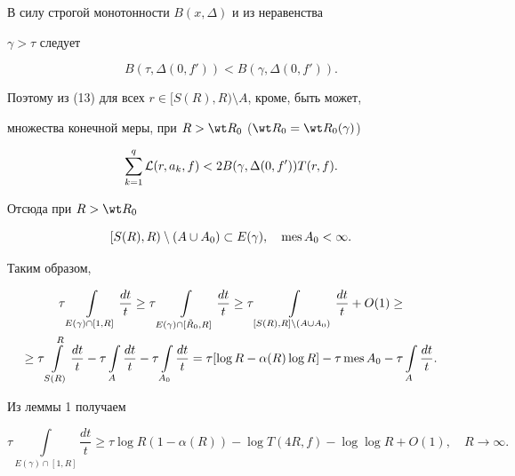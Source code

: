 В силу строгой монотонности $B(x,\Delta)$ и из неравенства


$\gamma>\tau$ следует 


$$


B(\tau,\Delta(0,f'))<B(\gamma,\Delta(0,f')).


$$


Поэтому из (13) для всех  $r\in [S(R),R)\setminus A$, кроме, быть может,


множества конечной меры, при $R>\wt R_0$ ($\wt R_0=\wt R_0(\gamma)$)


$$


\sum\limits_{k=1}^{q}{\cal L}(r,a_k,f)<


2B(\gamma,\Delta(0,f'))T(r,f).


$$


Отсюда при $R>\wt R_0$ 


$$


[S(R),R)\setminus (A\cup A_0)\subset E(\gamma), 


\quad \mes A_0<\infty. 


$$


Таким образом,


\begin{multline*}


\tau\int\limits_{E(\gamma)\cap [1,R]}\frac{dt}{t}\ge \tau\int


\limits_{E(\gamma)\cap [\Tilde R_0,R]}\frac{dt}{t}\ge


\tau\int\limits_{[S(R),R]\setminus (A\cup A_0)}


\frac{dt}{t}+O(1)\ge \\


%


\ge \tau\int\limits_{S(R)}^{R}\frac{dt}{t}- \tau\int


\limits_{A}\frac{dt}{t}-\tau\int


\limits_{A_0}\frac{dt}{t}=


\tau[\log R-\alpha(R)\log R]-\tau\mes A_0-\tau


\int\limits_{A}\frac{dt}{t}.


\end{multline*}


Из леммы 1 получаем


$$


\tau\int\limits_{E(\gamma)\cap [1,R]}\frac{dt}{t}\ge \tau


\log R(1-\alpha(R))-


\log T(4R,f)-\log\log R+O(1),\quad R\to\infty.


$$


